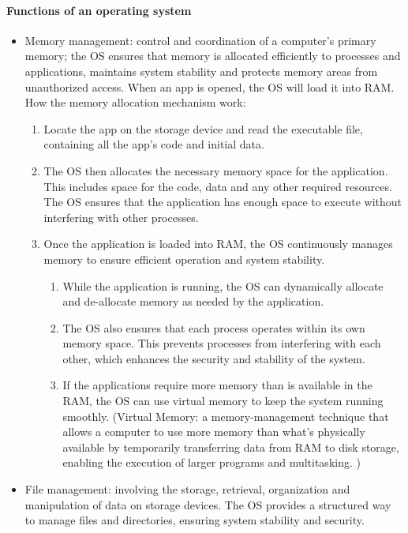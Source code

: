 \paragraph{Functions of an operating system}
\begin{itemize}
    \item Memory management: control and coordination of a computer's primary memory; the OS ensures that memory is allocated efficiently to processes and applications, maintains system stability and protects memory areas from unauthorized access. When an app is opened, the OS will load it into RAM. How the memory allocation mechanism work:
    \begin{enumerate}
        \item Locate the app on the storage device and read the executable file, containing all the app's code and initial data. 
        \item The OS then allocates the necessary memory space for the application. This includes space for the code, data and any other required resources. The OS ensures that the application has enough space to execute without interfering with other processes. 
        \item Once the application is loaded into RAM, the OS continuously manages memory to ensure efficient operation and system stability.
        \begin{enumerate}
            \item While the application is running, the OS can dynamically allocate and de-allocate memory as needed by the application. 
            \item The OS also ensures that 
each process operates within its own memory space. This prevents processes from interfering with each other, which enhances the security and stability of the system. 
\item If the applications require more memory than is available in the RAM, the OS can use virtual memory to keep the system running smoothly. (Virtual Memory: a memory-management technique that allows a computer to use more memory than what's physically available by temporarily transferring data from RAM to disk storage, enabling the execution of larger programs and multitasking. )
            \end{enumerate}
    \end{enumerate}
    \item File management: involving the storage, retrieval, organization and manipulation of data on storage devices. The OS provides a structured way to manage files and directories, ensuring system stability and security. 

\end{itemize}

